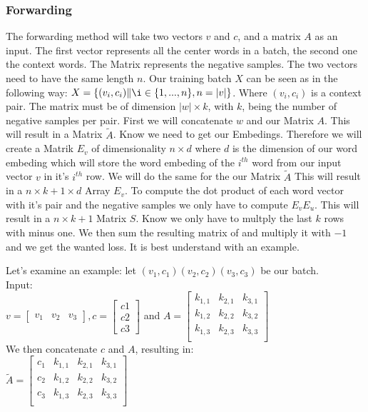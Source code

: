 \subsubsection{Forwarding}
The forwarding method will take two vectors $v$ and $c$, and a matrix $A$ as an input. The first vector represents all the center words in a batch, the second one the context words. The Matrix represents the negative samples. The two vectors need to have the same length $n$. Our training batch $X$ can be seen as in the following way:  $X = \{(v_i, c_i)\|\i \in \{1, ..., n\}, n = |v| \}$. Where $(v_i,c_i)$ is a context pair. The matrix must be of dimension $|w|\times k$, with $k$, being the number of negative samples per pair.  First we will concatenate $w$ and our Matrix $A$. This will result in a Matrix $\tilde{A}$.  Know we need to get our Embedings. Therefore we will create a Matrik $E_v$ of dimensionality $n \times d$ where $d$ is the dimension of our word embeding which will store the word embeding of the $i^{th}$ word from our input vector $v$ in it's $i^{th}$ row. We will do the same for the our Matrix $\tilde{A}$ This will result in a $n \times k+1 \times d$ Array $E_v$. To compute the dot product of each word vector with it's pair and the negative samples we only have to compute $E_v E_u$. This will result in a $n\times k+1$ Matrix $S$. Know we only have to multply the last $k$ rows with minus one.  We then sum the resulting matrix of and multiply it with $-1$  and we get the wanted loss. It is best understand with an example. 

Let's examine an example: let $(v_1,c_1)(v_2,c_2)(v_3,c_3)$ be our batch. \\
Input:\\
 $v = \begin{bmatrix}
v_1 & v_2 & v_3
\end{bmatrix}, c = \begin{bmatrix}
c1\\
c2\\
c3\end{bmatrix}$ and $A = 
\begin{bmatrix}
k_{1,1} & k_{2,1} & k_{3,1}\\
k_{1,2} & k_{2,2} & k_{3,2}\\
k_{1,3} & k_{2,3} & k_{3,3}\\
\end{bmatrix}$\\
 We then concatenate $c$ and $A$, 
resulting in: \\
$\tilde{A} = \begin{bmatrix}
c_1 & k_{1,1} & k_{2,1} & k_{3,1}\\
c_2 & k_{1,2} & k_{2,2} & k_{3,2}\\
c_3 & k_{1,3} & k_{2,3}& k_{3,3}\\
\end{bmatrix}$

